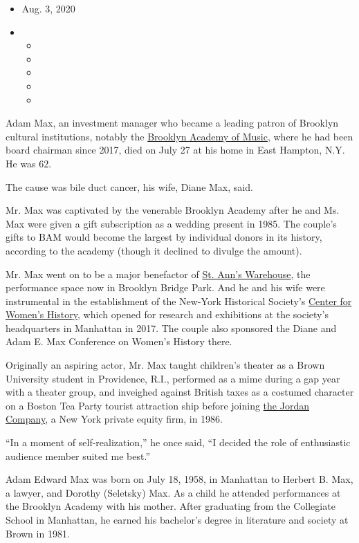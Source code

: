 \begin{itemize}
\item
  Aug. 3, 2020
\item
  \begin{itemize}
  \item
  \item
  \item
  \item
  \item
  \end{itemize}
\end{itemize}

Adam Max, an investment manager who became a leading patron of Brooklyn
cultural institutions, notably the \href{https://www.bam.org/}{Brooklyn
Academy of Music}, where he had been board chairman since 2017, died on
July 27 at his home in East Hampton, N.Y. He was 62.

The cause was bile duct cancer, his wife, Diane Max, said.

Mr. Max was captivated by the venerable Brooklyn Academy after he and
Ms. Max were given a gift subscription as a wedding present in 1985. The
couple's gifts to BAM would become the largest by individual donors in
its history, according to the academy (though it declined to divulge the
amount).

Mr. Max went on to be a major benefactor of
\href{https://stannswarehouse.org/}{St. Ann's Warehouse}, the
performance space now in Brooklyn Bridge Park. And he and his wife were
instrumental in the establishment of the New-York Historical Society's
\href{https://www.nyhistory.org/womens-history}{Center for Women's
History}, which opened for research and exhibitions at the society's
headquarters in Manhattan in 2017. The couple also sponsored the Diane
and Adam E. Max Conference on Women's History there.

Originally an aspiring actor, Mr. Max taught children's theater as a
Brown University student in Providence, R.I., performed as a mime during
a gap year with a theater group, and inveighed against British taxes as
a costumed character on a Boston Tea Party tourist attraction ship
before joining \href{https://www.thejordancompany.com/}{the Jordan
Company}, a New York private equity firm, in 1986.

``In a moment of self-realization,'' he once said, ``I decided the role
of enthusiastic audience member suited me best.''

Adam Edward Max was born on July 18, 1958, in Manhattan to Herbert B.
Max, a lawyer, and Dorothy (Seletsky) Max. As a child he attended
performances at the Brooklyn Academy with his mother. After graduating
from the Collegiate School in Manhattan, he earned his bachelor's degree
in literature and society at Brown in 1981.

